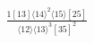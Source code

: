 \documentclass[varwidth, border=5pt]{standalone}
\begin{document}
\begin{my}
$\begin{gathered}
\scriptscriptstyle\frac{1[13]⟨14⟩^2⟨15⟩[25]}{⟨12⟩⟨13⟩^3[35]^2}
\end{gathered}$
\end{my}
\end{document}

